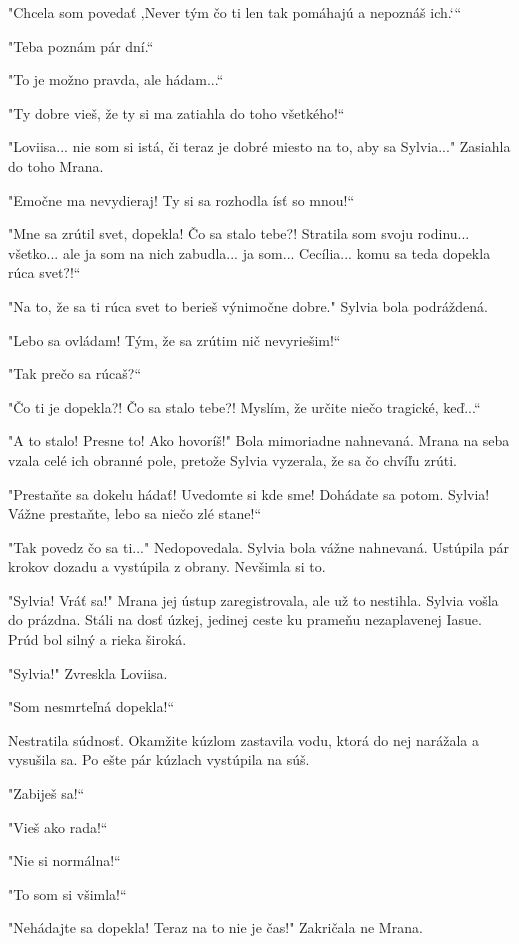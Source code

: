 \documentclass{book}
\begin{document}
"$ $Chcela som povedať ‚Never tým čo ti len tak pomáhajú a nepoznáš ich.‘“

"$ $Teba poznám pár dní.“

"$ $To je možno pravda, ale hádam...“

"$ $Ty dobre vieš, že ty si ma zatiahla do toho všetkého!“

"$ $Loviisa... nie som si istá, či teraz je dobré miesto na to, aby sa Sylvia..."$ $ Zasiahla do toho Mrana.

"$ $Emočne ma nevydieraj! Ty si sa rozhodla ísť so mnou!“

"$ $Mne sa zrútil svet, dopekla! Čo sa stalo tebe?! Stratila som svoju rodinu... všetko... ale ja som na nich zabudla... ja som... Cecília... komu sa teda dopekla rúca svet?!“

"$ $Na to, že sa ti rúca svet to berieš výnimočne dobre."$ $ Sylvia bola podráždená.

"$ $Lebo sa ovládam! Tým, že sa zrútim nič nevyriešim!“

"$ $Tak prečo sa rúcaš?“

"$ $Čo ti je dopekla?! Čo sa stalo tebe?! Myslím, že určite niečo tragické, keď...“

"$ $A to stalo! Presne to! Ako hovoríš!"$ $ Bola mimoriadne nahnevaná. Mrana na seba vzala celé ich obranné pole, pretože Sylvia vyzerala, že sa čo chvíľu zrúti.

"$ $Prestaňte sa dokelu hádať! Uvedomte si kde sme! Dohádate sa potom. Sylvia! Vážne prestaňte, lebo sa niečo zlé stane!“

"$ $Tak povedz čo sa ti..."$ $ Nedopovedala. Sylvia bola vážne nahnevaná. Ustúpila pár krokov dozadu a vystúpila z obrany. Nevšimla si to.

"$ $Sylvia! Vráť sa!"$ $ Mrana jej ústup zaregistrovala, ale už to nestihla. Sylvia vošla do prázdna. Stáli na dosť úzkej, jedinej ceste ku prameňu nezaplavenej Iasue. Prúd bol silný a rieka široká.

"$ $Sylvia!"$ $ Zvreskla Loviisa.

"$ $Som nesmrteľná dopekla!“

Nestratila súdnosť. Okamžite kúzlom zastavila vodu, ktorá do nej narážala a vysušila sa. Po ešte pár kúzlach vystúpila na súš.

"$ $Zabiješ sa!“

"$ $Vieš ako rada!“

"$ $Nie si normálna!“

"$ $To som si všimla!“

"$ $Nehádajte sa dopekla! Teraz na to nie je čas!"$ $ Zakričala ne Mrana.
\end{document}
